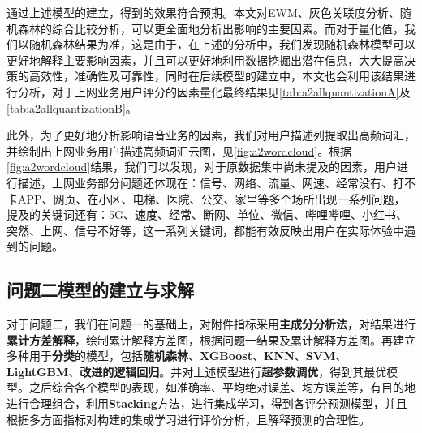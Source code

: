 \documentclass{MathorCupmodeling}
\begin{document}
	通过上述模型的建立，得到的效果符合预期。本文对EWM、灰色关联度分析、随机森林的综合比较分析，可以更全面地分析出影响的主要因素。而对于量化值，我们以随机森林结果为准，这是由于，在上述的分析中，我们发现随机森林模型可以更好地解释主要影响因素，并且可以更好地利用数据挖掘出潜在信息，大大提高决策的高效性，准确性及可靠性，同时在后续模型的建立中，本文也会利用该结果进行分析，对于上网业务用户评分的因素量化最终结果见\textcolor{blue}{\cref{tab:a2allquantizationA}}及\textcolor{blue}{\cref{tab:a2allquantizationB}}。

	此外，为了更好地分析影响语音业务的因素，我们对用户描述列提取出高频词汇，并绘制出上网业务用户描述高频词汇云图，见\textcolor{blue}{\cref{fig:a2wordcloud}}。根据\textcolor{blue}{\cref{fig:a2wordcloud}}结果，我们可以发现，对于原数据集中尚未提及的因素，用户进行描述，上网业务部分问题还体现在：信号、网络、流量、网速、经常没有、打不卡APP、网页、在小区、电梯、医院、公交、家里等多个场所出现一系列问题，提及的关键词还有：5G、速度、经常、断网、单位、微信、哔哩哔哩、小红书、突然、上网、信号不好等，这一系列关键词，都能有效反映出用户在实际体验中遇到的问题。

	\subsection{问题二模型的建立与求解}
	对于问题二，我们在问题一的基础上，对附件指标采用\textbf{主成分分析法}，对结果进行\textbf{累计方差解释}，绘制累计解释方差图，根据问题一结果及累计解释方差图。再建立多种用于\textbf{分类}的模型，包括\textbf{随机森林}、\textbf{XGBoost}、\textbf{KNN}、\textbf{SVM}、\textbf{LightGBM}、\textbf{改进的逻辑回归}。并对上述模型进行\textbf{超参数调优}，得到其最优模型。之后综合各个模型的表现，如准确率、平均绝对误差、均方误差等，有目的地进行合理组合，利用\textbf{Stacking}方法，进行集成学习，得到各评分预测模型，并且根据多方面指标对构建的集成学习进行评价分析，且解释预测的合理性。
\end{document}
